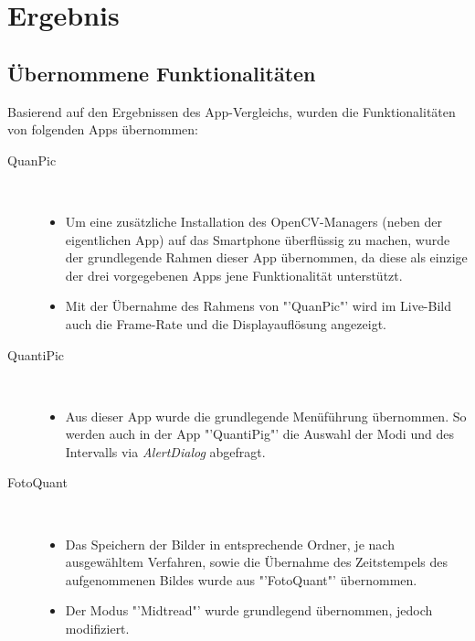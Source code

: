 
\section{Ergebnis}
\subsection{Übernommene Funktionalitäten}

Basierend auf den Ergebnissen des App-Vergleichs, wurden die Funktionalitäten von folgenden Apps übernommen:
\begin{description}
\item[QuanPic]~\par
\begin{itemize}
\item Um eine zusätzliche Installation des OpenCV-Managers (neben der eigentlichen App) auf das Smartphone überflüssig zu machen, wurde der grundlegende Rahmen dieser App übernommen, da diese als einzige der drei vorgegebenen Apps jene Funktionalität unterstützt.
\item Mit der Übernahme des Rahmens von "'QuanPic"' wird im Live-Bild auch die Frame-Rate und die Displayauflösung angezeigt.
\end{itemize}

\item[QuantiPic]~\par
\begin{itemize}
\item Aus dieser App wurde die grundlegende Menüführung übernommen. So werden auch in der App "'QuantiPig"' die Auswahl der Modi und des Intervalls via \textit{AlertDialog} abgefragt.
\end{itemize}

\item[FotoQuant]~\par
\begin{itemize}
\item Das Speichern der Bilder in entsprechende Ordner, je nach ausgewähltem Verfahren, sowie die Übernahme des Zeitstempels des aufgenommenen Bildes wurde aus "'FotoQuant"' übernommen.
\item Der Modus "'Midtread"' wurde grundlegend übernommen, jedoch modifiziert.
\end{itemize}



\end{description}
